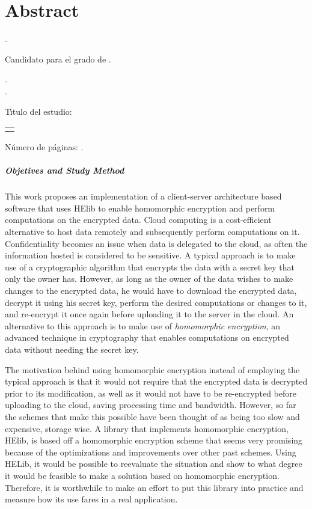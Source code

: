 \chapter{Abstract}

\noindent\autor.

\noindent Candidato para el grado de \grado.

\noindent\uanl.\\
\noindent\fime.

\noindent T\'{\i}tulo del estudio: 

\begin{center}
\begin{tabular}{p{13cm}}
	\centering
	\scshape{\large{\titulo}}
\end{tabular}
\end{center}\bigskip

\noindent N\'{u}mero de p\'{a}ginas: \pageref{LastPage}.

\paragraph{Objetives and Study Method}
This work proposes an implementation of a client-server architecture based software that uses HElib to enable homomorphic encryption and perform computations on the encrypted data. Cloud computing is a cost-efficient alternative to host data remotely and subsequently perform computations on it. Confidentiality becomes an issue when data is delegated to the cloud, as often the information hosted is considered to be sensitive. A typical approach is to make use of a cryptographic algorithm that encrypts the data with a secret key that only the owner has. However, as long as the owner of the data wishes to make changes to the encrypted data, he would have to download the encrypted data, decrypt it using his secret key, perform the desired computations or changes to it, and re-encrypt it once again before uploading it to the server in the cloud. An alternative to this approach is to make use of \emph{homomorphic encryption}, an advanced technique in cryptography that enables computations on encrypted data without needing the secret key. 

The motivation behind using homomorphic encryption instead of employing the typical approach is that it would not require that the encrypted data is decrypted prior to its modification, as well as it would not have to be re-encrypted before uploading to the cloud, saving processing time and bandwidth. However, so far the schemes that make this possible have been thought of as being too slow and expensive, storage wise. A library that implements homomorphic encryption, HElib, is based off a homomorphic encryption scheme that seems very promising because of the optimizations and improvements over other past schemes. Using HELib, it would be possible to reevaluate the situation and show to what degree it would be feasible to make a solution based on homomorphic encryption. Therefore, it is worthwhile to make an effort to put this library into practice and measure how its use fares in a real application.

